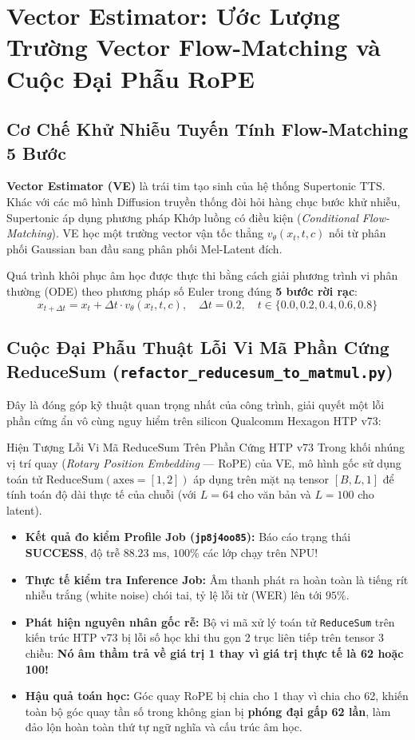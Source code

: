 \documentclass[11pt,a4paper,oneside,table]{report}
\begin{document}
\chapter{Vector Estimator: Ước Lượng Trường Vector Flow-Matching và Cuộc Đại Phẫu RoPE}
\label{chap:ve}

\section{Cơ Chế Khử Nhiễu Tuyến Tính Flow-Matching 5 Bước}
\textbf{Vector Estimator (VE)} là trái tim tạo sinh của hệ thống Supertonic TTS. Khác với các mô hình Diffusion truyền thống đòi hỏi hàng chục bước khử nhiễu, Supertonic áp dụng phương pháp Khớp luồng có điều kiện (\textit{Conditional Flow-Matching}). VE học một trường vector vận tốc thẳng $v_\theta(x_t, t, c)$ nối từ phân phối Gaussian ban đầu sang phân phối Mel-Latent đích.

Quá trình khôi phục âm học được thực thi bằng cách giải phương trình vi phân thường (ODE) theo phương pháp số Euler trong đúng \textbf{5 bước rời rạc}:
\begin{equation}
    x_{t + \Delta t} = x_t + \Delta t \cdot v_\theta(x_t, t, c), \quad \Delta t = 0.2, \quad t \in \{0.0, 0.2, 0.4, 0.6, 0.8\}
\end{equation}

\section{Cuộc Đại Phẫu Thuật Lỗi Vi Mã Phần Cứng ReduceSum (\texttt{refactor\_reducesum\_to\_matmul.py})}
Đây là đóng góp kỹ thuật quan trọng nhất của công trình, giải quyết một lỗi phần cứng ẩn vô cùng nguy hiểm trên silicon Qualcomm Hexagon HTP v73:

\begin{technicalbox}{Hiện Tượng Lỗi Vi Mã ReduceSum Trên Phần Cứng HTP v73}
Trong khối nhúng vị trí quay (\textit{Rotary Position Embedding} --- RoPE) của VE, mô hình gốc sử dụng toán tử $\text{ReduceSum}(\text{axes}=[1,2])$ áp dụng trên mặt nạ tensor $[B, L, 1]$ để tính toán độ dài thực tế của chuỗi (với $L=64$ cho văn bản và $L=100$ cho latent).
\begin{itemize}
    \item \textbf{Kết quả đo kiểm Profile Job (\texttt{jp8j4oo85}):} Báo cáo trạng thái \textbf{SUCCESS}, độ trễ $88.23\text{ ms}$, $100\%$ các lớp chạy trên NPU!
    \item \textbf{Thực tế kiểm tra Inference Job:} Âm thanh phát ra hoàn toàn là tiếng rít nhiễu trắng (white noise) chói tai, tỷ lệ lỗi từ (WER) lên tới $95\%$.
    \item \textbf{Phát hiện nguyên nhân gốc rễ:} Bộ vi mã xử lý toán tử \texttt{ReduceSum} trên kiến trúc HTP v73 bị lỗi số học khi thu gọn 2 trục liên tiếp trên tensor 3 chiều: \textbf{Nó âm thầm trả về giá trị 1 thay vì giá trị thực tế là 62 hoặc 100!}
    \item \textbf{Hậu quả toán học:} Góc quay RoPE bị chia cho 1 thay vì chia cho 62, khiến toàn bộ góc quay tần số trong không gian bị \textbf{phóng đại gấp 62 lần}, làm đảo lộn hoàn toàn thứ tự ngữ nghĩa và cấu trúc âm học.
\end{itemize}
\end{technicalbox}
\end{document}
